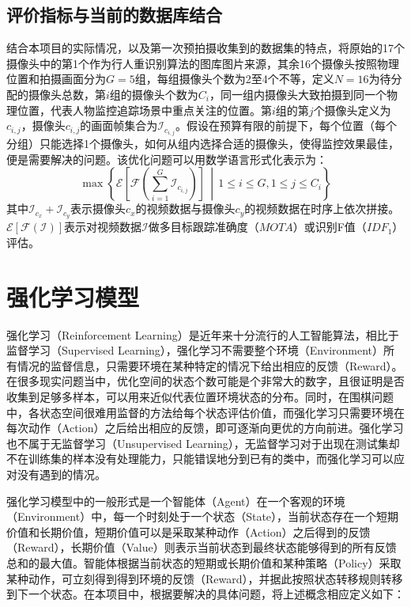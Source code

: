 \subsection{评价指标与当前的数据库结合}

结合本项目的实际情况，以及第一次预拍摄收集到的数据集的特点，将原始的17个摄像头中的第1个作为行人重识别算法的图库图片来源，其余16个摄像头按照物理位置和拍摄画面分为$G=5$组，每组摄像头个数为2至4个不等，定义$N=16$为待分配的摄像头总数，第$i$组的摄像头个数为$C_i$，同一组内摄像头大致拍摄到同一个物理位置，代表人物监控追踪场景中重点关注的位置。第$i$组的第$j$个摄像头定义为$c_{i,j}$，摄像头$c_{i,j}$的画面帧集合为$\mathcal{I}_{c_{i,j}}$。假设在预算有限的前提下，每个位置（每个分组）只能选择1个摄像头，如何从组内选择合适的摄像头，使得监控效果最佳，便是需要解决的问题。该优化问题可以用数学语言形式化表示为：
\begin{equation}
\max \left\{\mathcal{E}\left[\mathcal{F}\left(\sum_{i=1}^G \mathcal{I}_{c_{i,j}}\right)\right]\,\middle\vert\, 1\leq i \leq G, 1\leq j \leq C_i\right\}
\end{equation}
其中$\mathcal{I}_{c_x}+\mathcal{I}_{c_y}$表示摄像头$c_x$的视频数据与摄像头$c_y$的视频数据在时序上依次拼接。$\mathcal{E}[\mathcal{F}(\mathcal{I})]$表示对视频数据$\mathcal{I}$做多目标跟踪准确度（$\mathit{MOTA}$）或识别F值（$\mathit{IDF_1}$）评估。

\section{强化学习模型}

强化学习（Reinforcement Learning）是近年来十分流行的人工智能算法，相比于监督学习（Supervised Learning），强化学习不需要整个环境（Environment）所有情况的监督信息，只需要环境在某种特定的情况下给出相应的反馈（Reward）。在很多现实问题当中，优化空间的状态个数可能是个非常大的数字，且很证明是否收集到足够多样本，可以用来近似代表位置环境状态的分布。同时，在围棋问题\cite{silver2016mastering}中，各状态空间很难用监督的方法给每个状态评估价值，而强化学习只需要环境在每次动作（Action）之后给出相应的反馈，即可逐渐向更优的方向前进。强化学习也不属于无监督学习（Unsupervised Learning），无监督学习对于出现在测试集却不在训练集的样本没有处理能力，只能错误地分到已有的类中，而强化学习可以应对没有遇到的情况。

强化学习模型中的一般形式是一个智能体（Agent）在一个客观的环境（Environment）中，每一个时刻处于一个状态（State），当前状态存在一个短期价值和长期价值，短期价值可以是采取某种动作（Action）之后得到的反馈（Reward），长期价值（Value）则表示当前状态到最终状态能够得到的所有反馈总和的最大值。智能体根据当前状态的短期或长期价值和某种策略（Policy）采取某种动作，可立刻得到得到环境的反馈（Reward），并据此按照状态转移规则转移到下一个状态。在本项目中，根据要解决的具体问题，将上述概念相应定义如下：

